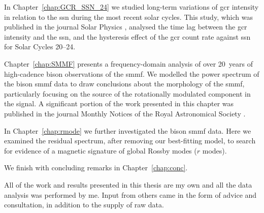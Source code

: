 In Chapter~\ref{chap:GCR_SSN_24} we studied long-term variations of \gls{gcr} intensity in relation to the \gls{ssn} during the most recent solar cycles. This study, which was published in the journal Solar Physics \citep{ross_behaviour_2019}, analysed the time lag between the \gls{gcr} intensity and the \gls{ssn}, and the hysteresis effect of the \gls{gcr} count rate against \gls{ssn} for Solar Cycles 20--24.

Chapter~\ref{chap:SMMF} presents a frequency-domain analysis of over 20~years of high-cadence \gls{bison} observations of the \gls{smmf}. We modelled the power spectrum of the \gls{bison} \gls{smmf} data to draw conclusions about the morphology of the \gls{smmf}, particularly focusing on the source of the rotationally modulated component in the signal. A significant portion of the work presented in this chapter was published in the journal Monthly Notices of the Royal Astronomical Society \citep{ross_lifetimes_2021}.

In Chapter~\ref{chap:rmode} we further investigated the \gls{bison} \gls{smmf} data. Here we examined the residual spectrum, after removing our best-fitting model, to search for evidence of a magnetic signature of global Rossby modes ($r$ modes). %

We finish with concluding remarks in Chapter~\ref{chap:conc}.

All of the work and results presented in this thesis are my own and all the data analysis was performed by me. Input from others came in the form of advice and consultation, in addition to the supply of raw data.
